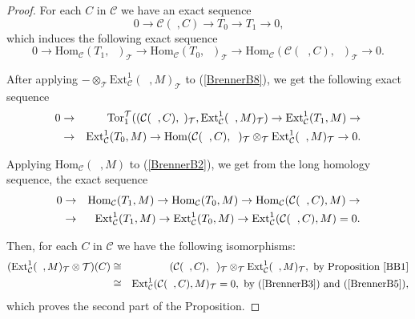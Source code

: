 \documentclass{amsart}
\theoremstyle{plain}
\numberwithin{equation}{section}
\begin{document}
\begin{proof}
For each $C$ in $\mathcal{C}$ we have an exact sequence
\begin{equation}
0\rightarrow \mathcal{C}(\;,C)\rightarrow T_{0}\rightarrow T_{1}\rightarrow 0\text{,}  \label{BrennerB2}
\end{equation}which induces the following exact sequence
\begin{equation}
0\rightarrow \mathrm{Hom}_{\mathcal{C}}(T_{1},\;\;)_{\mathcal{T}}\rightarrow
\mathrm{Hom}_{\mathcal{C}}(T_{0},\;\;)_{\mathcal{T}}\rightarrow \mathrm{Hom}_{\mathcal{C}}(\mathcal{C}(\;\;,C),\;\;)_{\mathcal{T}}\rightarrow 0\text{.}
\label{BrennerB8}
\end{equation}

After applying $-\otimes _{\mathcal{T}}\mathrm{Ext}_{\mathcal{C}}^{1}(\;\;,M)_{\mathcal{T}}$ to (\ref{BrennerB8}), we get the following
exact sequence
\begin{eqnarray}  \label{BrennerB3}
0 &\rightarrow &\mathrm{Tor}_{1}^{\mathcal{T}}((\mathcal{C}(\;\;,C),\;)_{\mathcal{T}},\mathrm{Ext}_{\mathcal{C}}^{1}(\;\;,M)_{\mathcal{T}})\rightarrow \mathrm{Ext}_{\mathcal{C}}^{1}(T_{1},M)\rightarrow \\
&\rightarrow &\mathrm{Ext}_{\mathcal{C}}^{1}(T_{0},M)\rightarrow \mathrm{Hom}(\mathcal{C}(\;\;,C),\;\;)_{\mathcal{T}}\otimes _{\mathcal{T}}\mathrm{Ext}_{\mathcal{C}}^{1}(\;\;,M)_{\mathcal{T}}\rightarrow 0\text{.}  \notag
\end{eqnarray}

Applying $\mathrm{Hom}_{\mathcal{C}}(\;\;,M)$ to (\ref{BrennerB2}), we get
from the long homology sequence, the exact sequence
\begin{eqnarray}
0 &\rightarrow &\mathrm{Hom}_{\mathcal{C}}(T_{1},M)\rightarrow \mathrm{Hom}_{\mathcal{C}}(T_{0},M)\rightarrow \mathrm{Hom}_{\mathcal{C}}(\mathcal{C}(\;\;,C),M)\rightarrow  \label{BrennerB5} \\
&\rightarrow &\mathrm{Ext}_{\mathcal{C}}^{1}(T_{1},M)\rightarrow \mathrm{Ext}_{\mathcal{C}}^{1}(T_{0},M)\rightarrow \mathrm{Ext}_{\mathcal{C}}^{1}(\mathcal{C}(\;\;,C),M)=0\text{.}  \notag
\end{eqnarray}

Then, for each $C$ in $\mathcal{C}$ we have the following isomorphisms:
\begin{eqnarray*}
(\mathrm{Ext}_{\mathcal{C}}^{1}(\;\;,M)_{\mathcal{T}}\otimes \mathcal{T})(C)
&\cong &(\mathcal{C}(\;\;,C),\;\;)_{\mathcal{T}}\otimes _{\mathcal{T}}\mathrm{Ext}_{\mathcal{C}}^{1}(\;\;,M)_\mathcal{T},\text{ by Proposition \ref{BB1}} \\
&\cong &\mathrm{Ext}_{\mathcal{C}}^{1}(\mathcal{C}(\;\;,C),M)_{\mathcal{T}}=0,\text{ by (\ref{BrennerB3}) and (\ref{BrennerB5}),}
\end{eqnarray*}which proves the second part of the Proposition.


\end{proof}
\end{document}

